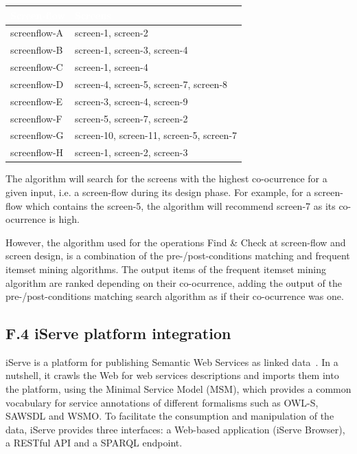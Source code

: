 \documentclass{fast_latex}
\begin{document}
\begin{table}[h]
\begin{center}
\begin{tabular}{|p{3.5cm}|p{10cm}|}
\hline
\rowcolor{fast@lightgrey}\textcolor{white}{Screen-flow} &
                         \textcolor{white}{Screens} \\ \hline
screenflow-A & screen-1, screen-2 \\ \hline
screenflow-B & screen-1, screen-3, screen-4 \\ \hline
screenflow-C & screen-1, screen-4 \\ \hline
screenflow-D & screen-4, screen-5, screen-7, screen-8 \\ \hline
screenflow-E & screen-3, screen-4, screen-9 \\ \hline
screenflow-F & screen-5, screen-7, screen-2 \\ \hline
screenflow-G & screen-10, screen-11, screen-5, screen-7 \\ \hline
screenflow-H & screen-1, screen-2, screen-3 \\ \hline
\end{tabular}
\end{center}
\end{table}

The algorithm will search for the screens with the highest co-ocurrence for a given input, i.e. a screen-flow during its design phase. For example, for a screen-flow which contains the screen-5, the algorithm will recommend screen-7 as its co-ocurrence is high.

However, the algorithm used for the operations Find \& Check at screen-flow and screen design, is a combination of the pre-/post-conditions matching and frequent itemset mining algorithms. The output items of the frequent itemset mining algorithm are ranked depending on their co-ocurrence, adding the output of the pre-/post-conditions matching search algorithm as if their co-ocurrence was one.


\subsection*{F.4 iServe platform integration}

iServe is a platform for publishing Semantic Web Services as linked data~\cite{oro23093}. In a nutshell, it crawls the Web for web services descriptions and imports them into the platform, using the Minimal Service Model (MSM), which provides a common vocabulary for service annotations of different formalisms such as OWL-S, SAWSDL and WSMO. To facilitate the consumption and manipulation of the data, iServe provides three interfaces: a Web-based application (iServe Browser), a RESTful API and a SPARQL endpoint.
\end{document}
